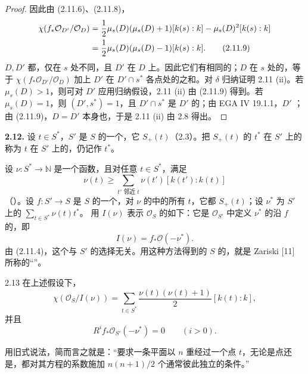\begin{proof}
因此由 (2.11.6)、(2.11.8)，
\begin{align}
\chi(f_*\mathcal O_{D'}/\mathcal O_D)
&=\frac12\mu_s(D)(\mu_s(D)+1)[k(s):k]-\mu_s(D)^2[k(s):k]\notag\\
&=\frac12\mu_s(D)(\mu_s(D)-1)[k(s):k].\tag{2.11.9}
\end{align}
 $D,D'$ 都，仅在 $s$ 处不同，且 $D'$ 在 $D$ 上。因此它们有相同的；$D$ 在 $s$ 处的，等于 $\chi(f_*\mathcal O_{D'}/\mathcal O_D)$ 加上 $D'$ 在 $D'\cap s^*$ 各点处的之和。对 $\delta$ 归纳证明 2.11 (ii)。若 $\mu_s(D)>1$，则可对 $D'$ 应用归纳假设，2.11 (ii) 由 (2.11.9) 得到。若 $\mu_s(D)=1$，则 $(D',s^*)=1$，且 $D'\cap s^*$ 是 $D'$ 的；由 EGA IV 19.1.1，$D'$ ；由 (2.11.9)，$D=D'$ 本身也，于是 2.11 (ii) 由 2.8 得出。
\end{proof}

\textbf{2.12.} 设 $t\in S^*$，$S'$ 是 $S$ 的一个，它 $S_+(t)$（2.3）。把 $S_+(t)$ 的 $t^*$ 在 $S'$ 上的称为 $t$ 在 $S'$ 上的，仍记作 $t^*$。

设 $\nu:S^*\to\mathbb N$ 是一个函数，且对任意 $t\in S^*$，满足
\[
\nu(t)\geq\sum_{t'\text{ 邻近 }t}\nu(t')[k(t'):k(t)]\tag{2.12.1}
\]
（）。设 $f:S'\to S$ 是 $S$ 的一个，对 $\nu$ 的中的所有 $t$，它都 $S_+(t)$；设 $\nu^*$ 为 $S'$ 上的 $\sum_{t\in S^*}\nu(t)t^*$。
用 $I(\nu)$ 表示 $\mathcal O_S$ 的如下：它是 $\mathcal O_{S'}$ 中定义 $\nu^*$ 的沿 $f$ 的，即
\[
I(\nu)=f_*\mathcal O(-\nu^*).
\]
由 (2.11.4)，这个与 $S'$ 的选择无关。用这种方法得到的 $S$ 的，就是 Zariski [11] 所称的“”。

\begin{SGAresult}{}{2.13}
在上述假设下，
\[
\chi(\mathcal O_S/I(\nu))=
\sum_{t\in S^*}\frac{\nu(t)(\nu(t)+1)}2[k(t):k],
\]
并且
\[
R^if_*\mathcal O_{S'}(-\nu^*)=0\qquad(i>0).
\]
\end{SGAresult}
用旧式说法，简而言之就是：“要求一条平面以 $n$ 重经过一个点 $t$，无论是点还是，都对其方程的系数施加 $n(n+1)/2$ 个通常彼此独立的条件。”

